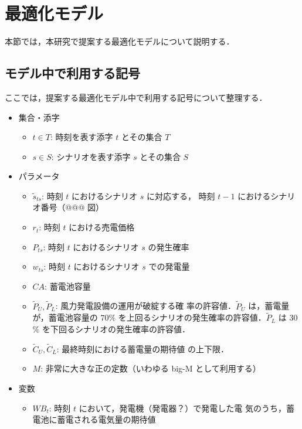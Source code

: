 \documentclass{jarticle}
\begin{document}
\section{最適化モデル}

本節では，本研究で提案する最適化モデルについて説明する．

\subsection{モデル中で利用する記号}

ここでは，提案する最適化モデル中で利用する記号について整理する．

\begin{itemize}
\item 集合・添字
      \begin{itemize}
    \item $t \in T$: 時刻を表す添字 $t$ とその集合 $T$
    \item $s \in S$: シナリオを表す添字 $s$ とその集合 $S$
      \end{itemize}
\item パラメータ
      \begin{itemize}
    \item $\tilde{s}_{ts}$: 時刻 $t$ におけるシナリオ $s$ に対応する，
          時刻 $t - 1$ におけるシナリオ番号（@@@ 図）
    \item $r_t$: 時刻 $t$ における売電価格
    \item $P_{ts}$: 時刻 $t$ におけるシナリオ $s$ の発生確率
    \item $w_{ts}$: 時刻 $t$ におけるシナリオ $s$ での発電量
    \item $CA$: 蓄電池容量
    \item $\tilde{P}_U, \tilde{P}_L$: 風力発電設備の運用が破綻する確
          率の許容値．$\tilde{P}_U$ は，蓄電量が，蓄電池容量の
          $70$\% を上回るシナリオの発生確率の許容値．$\tilde{P}_L$
          は $30$\% を下回るシナリオの発生確率の許容値．
    \item $\tilde{C}_U, \tilde{C}_L$: 最終時刻における蓄電量の期待値
          の上下限．
    \item $M$: 非常に大きな正の定数（いわゆる big-M として利用する）
      \end{itemize}
\item 変数
      \begin{itemize}
    \item $WB_t$: 時刻 $t$ において，発電機（発電器？）で発電した電
          気のうち，蓄電池に蓄電される電気量の期待値

\end{itemize}
\end{itemize}
\end{document}
